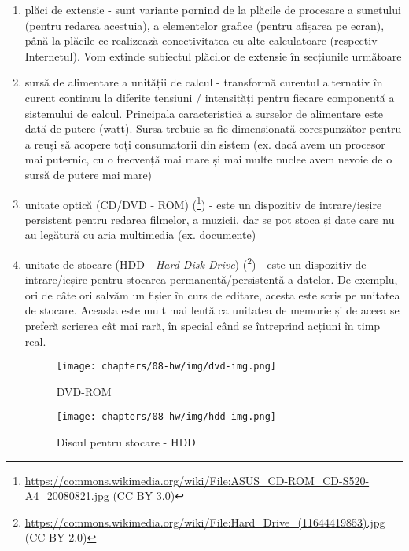 \begin{enumerate}
  \item plăci de extensie - sunt variante pornind de la plăcile de procesare a sunetului (pentru redarea acestuia), a elementelor grafice (pentru afișarea pe ecran), până la plăcile ce realizează conectivitatea cu alte calculatoare (respectiv Internetul).
    Vom extinde subiectul plăcilor de extensie în secțiunile următoare
  \item sursă de alimentare a unității de calcul - transformă curentul alternativ în curent continuu la diferite tensiuni / intensități pentru fiecare componentă a sistemului de calcul.
    Principala caracteristică a surselor de alimentare este dată de putere (watt).
    Sursa trebuie sa fie dimensionată corespunzător pentru a reuși să acopere toți consumatorii din sistem (ex. dacă avem un procesor mai puternic, cu o frecvență mai mare și mai multe nuclee avem nevoie de o sursă de putere mai mare)
  \item unitate optică (CD/DVD - ROM)  (\footnote{\url{https://commons.wikimedia.org/wiki/File:ASUS_CD-ROM_CD-S520-A4_20080821.jpg} (CC BY 3.0)}) - este un dispozitiv de intrare/ieșire persistent pentru redarea filmelor, a muzicii, dar se pot stoca și date care nu au legătură cu aria multimedia (ex. documente)
  \item unitate de stocare (HDD  - \textit{Hard Disk Drive}) (\footnote{\url{https://commons.wikimedia.org/wiki/File:Hard_Drive_(11644419853).jpg} (CC BY 2.0)}) - este un dispozitiv de intrare/ieșire pentru stocarea permanentă/persistentă a datelor.
    De exemplu, ori de câte ori salvăm un fișier în curs de editare, acesta este scris pe unitatea de stocare.
    Aceasta este mult mai lentă ca unitatea de memorie și de aceea se preferă scrierea cât mai rară, în special când se întreprind acțiuni în timp real.

\begin{figure}[!htbp]
  \centering
  \texttt{[image: chapters/08-hw/img/dvd-img.png]}
  \caption{DVD-ROM}
  \label{fig:hw:dvd}
\end{figure}

\begin{figure}[!htbp]
  \centering
  \texttt{[image: chapters/08-hw/img/hdd-img.png]}
  \caption{Discul pentru stocare - HDD}
  \label{fig:hw:hdd}
\end{figure}


\end{enumerate}
